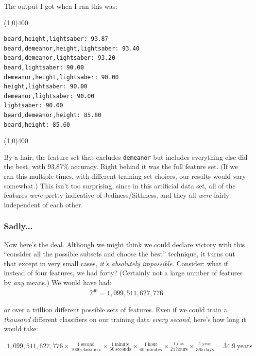 \documentclass[12pt]{article}
\begin{document}
\pagebreak
The output I got when I ran this was:

\begin{center}
\line(1,0){400}
\end{center}
\footnotesize
\begin{Verbatim}[fontsize=\small,samepage=true,frame=none]
beard,height,lightsaber: 93.87
beard,demeanor,height,lightsaber: 93.40
beard,demeanor,lightsaber: 93.20
beard,lightsaber: 90.00
demeanor,height,lightsaber: 90.00
height,lightsaber: 90.00
demeanor,lightsaber: 90.00
lightsaber: 90.00
beard,demeanor,height: 85.80
beard,height: 85.60
\end{Verbatim}
\normalsize
\begin{center}
\line(1,0){400}
\end{center}

By a hair, the feature set that excludes \texttt{demeanor} but includes
everything else did the best, with 93.87\% accuracy. Right behind it was the
full feature set. (If we ran this multiple times, with different training set
choices, our results would vary somewhat.) This isn't too surprising, since in
this artificial data set, all of the features \textit{were} pretty indicative
of Jediness/Sithness, and they all \textit{were} fairly independent of each
other.

\subsubsection{Sadly...}

Now here's the deal. Although we might think we could declare victory with
this ``consider all the possible subsets and choose the best'' technique, it
turns out that except in very small cases, \textit{it's absolutely
impossible.} Consider: what if instead of four features, we had forty?
(Certainly not a large number of features by \textit{any} means.) We would
have had:
\begin{align*}
2^{40} = 1,099,511,627,776
\end{align*}

or over a trillion different possible sets of features. Even if we could train
a \textit{thousand} different classifiers on our training data \textit{every
second}, here's how long it would take:

\footnotesize
\begin{align*}
1,099,511,627,776 \times 
    \frac{1\ \textrm{second}}{1000\ \textrm{classifiers}} \times
    \frac{1\ \textrm{minute}}{60\ \textrm{seconds}} \times
    \frac{1\ \textrm{hour}}{60\ \textrm{minutes}} \times
    \frac{1\ \textrm{day}}{24\ \textrm{hours}} \times
    \frac{1\ \textrm{year}}{365\ \textrm{days}} = 34.9\ \textrm{years}
\end{align*}
\end{document}

